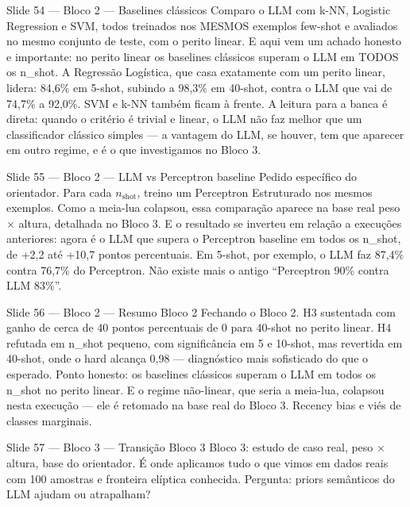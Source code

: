 \documentclass[aspectratio=169,10pt]{beamer}
\begin{document}
\begin{frame}{Slide 54 --- Bloco 2 --- Baselines cl\'assicos}
\footnotesize
Comparo o LLM com k-NN, Logistic Regression e SVM, todos treinados nos MESMOS exemplos few-shot e avaliados no mesmo conjunto de teste, com o perito linear. E aqui vem um achado honesto e importante: no perito linear os baselines cl\'assicos superam o LLM em TODOS os n\_shot. A Regress\~ao Log\'istica, que casa exatamente com um perito linear, lidera: 84,6\% em 5-shot, subindo a 98,3\% em 40-shot, contra o LLM que vai de 74,7\% a 92,0\%. SVM e k-NN tamb\'em ficam \`a frente. A leitura para a banca \'e direta: quando o crit\'erio \'e trivial e linear, o LLM n\~ao faz melhor que um classificador cl\'assico simples --- a vantagem do LLM, se houver, tem que aparecer em outro regime, e \'e o que investigamos no Bloco 3.
\end{frame}

\begin{frame}{Slide 55 --- Bloco 2 --- LLM vs Perceptron baseline}
\footnotesize
Pedido espec\'ifico do orientador. Para cada $n_{\text{shot}}$, treino um Perceptron Estruturado nos mesmos exemplos. Como a meia-lua colapsou, essa compara\c{c}\~ao aparece na base real peso $\times$ altura, detalhada no Bloco 3. E o resultado se inverteu em rela\c{c}\~ao a execu\c{c}\~oes anteriores: agora \'e o LLM que supera o Perceptron baseline em todos os n\_shot, de +2,2 at\'e +10,7 pontos percentuais. Em 5-shot, por exemplo, o LLM faz 87,4\% contra 76,7\% do Perceptron. N\~ao existe mais o antigo ``Perceptron 90\% contra LLM 83\%''.
\end{frame}

\begin{frame}{Slide 56 --- Bloco 2 --- Resumo Bloco 2}
\footnotesize
Fechando o Bloco 2. H3 sustentada com ganho de cerca de 40 pontos percentuais de 0 para 40-shot no perito linear. H4 refutada em n\_shot pequeno, com signific\^ancia em 5 e 10-shot, mas revertida em 40-shot, onde o hard alcan\c{c}a 0,98 --- diagn\'ostico mais sofisticado do que o esperado. Ponto honesto: os baselines cl\'assicos superam o LLM em todos os n\_shot no perito linear. E o regime n\~ao-linear, que seria a meia-lua, colapsou nesta execu\c{c}\~ao --- ele \'e retomado na base real do Bloco 3. Recency bias e vi\'es de classes marginais.
\end{frame}

\begin{frame}{Slide 57 --- Bloco 3 --- Transi\c{c}\~ao Bloco 3}
\footnotesize
Bloco 3: estudo de caso real, peso $\times$ altura, base do orientador. \'E onde aplicamos tudo o que vimos em dados reais com 100 amostras e fronteira el\'iptica conhecida. Pergunta: priors sem\^anticos do LLM ajudam ou atrapalham?
\end{frame}
\end{document}
